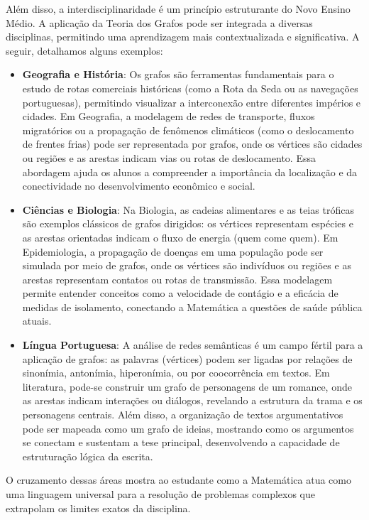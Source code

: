 \documentclass[
  12pt,
  oneside,
  a4paper,
  english,
  brazilian
  ]{abntex2}
\theoremstyle{definition}
\begin{document}
Além disso, a interdisciplinaridade é um princípio estruturante do Novo Ensino Médio. A aplicação da Teoria dos Grafos pode ser integrada a diversas disciplinas, permitindo uma aprendizagem mais contextualizada e significativa. A seguir, detalhamos alguns exemplos:

\begin{itemize}
  \item \textbf{Geografia e História}: 
    Os grafos são ferramentas fundamentais para o estudo de rotas comerciais históricas (como a Rota da Seda ou as navegações portuguesas), permitindo visualizar a interconexão entre diferentes impérios e cidades. Em Geografia, a modelagem de redes de transporte, fluxos migratórios ou a propagação de fenômenos climáticos (como o deslocamento de frentes frias) pode ser representada por grafos, onde os vértices são cidades ou regiões e as arestas indicam vias ou rotas de deslocamento. Essa abordagem ajuda os alunos a compreender a importância da localização e da conectividade no desenvolvimento econômico e social.

  \item \textbf{Ciências e Biologia}: 
    Na Biologia, as cadeias alimentares e as teias tróficas são exemplos clássicos de grafos dirigidos: os vértices representam espécies e as arestas orientadas indicam o fluxo de energia (quem come quem). Em Epidemiologia, a propagação de doenças em uma população pode ser simulada por meio de grafos, onde os vértices são indivíduos ou regiões e as arestas representam contatos ou rotas de transmissão. Essa modelagem permite entender conceitos como a velocidade de contágio e a eficácia de medidas de isolamento, conectando a Matemática a questões de saúde pública atuais.

  \item \textbf{Língua Portuguesa}: 
    A análise de redes semânticas é um campo fértil para a aplicação de grafos: as palavras (vértices) podem ser ligadas por relações de sinonímia, antonímia, hiperonímia, ou por coocorrência em textos. Em literatura, pode-se construir um grafo de personagens de um romance, onde as arestas indicam interações ou diálogos, revelando a estrutura da trama e os personagens centrais. Além disso, a organização de textos argumentativos pode ser mapeada como um grafo de ideias, mostrando como os argumentos se conectam e sustentam a tese principal, desenvolvendo a capacidade de estruturação lógica da escrita.
\end{itemize}

O cruzamento dessas áreas mostra ao estudante como a Matemática atua como uma linguagem universal para a resolução de problemas complexos que extrapolam os limites exatos da disciplina.
\end{document}
